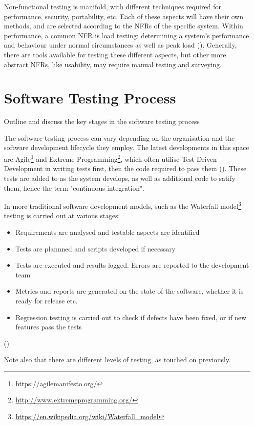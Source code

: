 \documentclass[12pt]{article}
\begin{document}
Non-functional testing is manifold, with different techniques required for performance, security, portability, etc. Each of these aspects will have their own methods, and are selected according to the NFRs of the specific system. Within performance, a common NFR is load testing: determining a system's performance and behaviour under normal circumstances as well as peak load (). Generally, there are tools available for testing these different aspects, but other more abstract NFRs, like usability, may require manual testing and surveying.



\section{Software Testing Process}
Outline and discuss the key stages in the software testing process

The software testing process can vary depending on the organisation and the software development lifecycle they employ. The latest developments in this space are Agile\footnote{\url{https://agilemanifesto.org/}} and Extreme Programming\footnote{\url{http://www.extremeprogramming.org/}}, which often utilise Test Driven Development in writing tests first, then the code required to pass them (). These tests are added to as the system develops, as well as additional code to satify them, hence the term "continuous integration". 

In more traditional software development models, such as the Waterfall model\footnote{\url{https://en.wikipedia.org/wiki/Waterfall_model}} testing is carried out at various stages:

\begin{itemize}
  \item Requirements are analysed and testable aspects are identified
  \item Tests are plannned and scripts developed if necessary
  \item Tests are executed and results logged. Errors are reported to the development team
  \item Metrics and reports are generated on the state of the software, whether it is ready for release etc.
  \item Regression testing is carried out to check if defects have been fixed, or if new features pass the tests
\end{itemize}
()

Note also that there are different levels of testing, as touched on previously.
\end{document}
